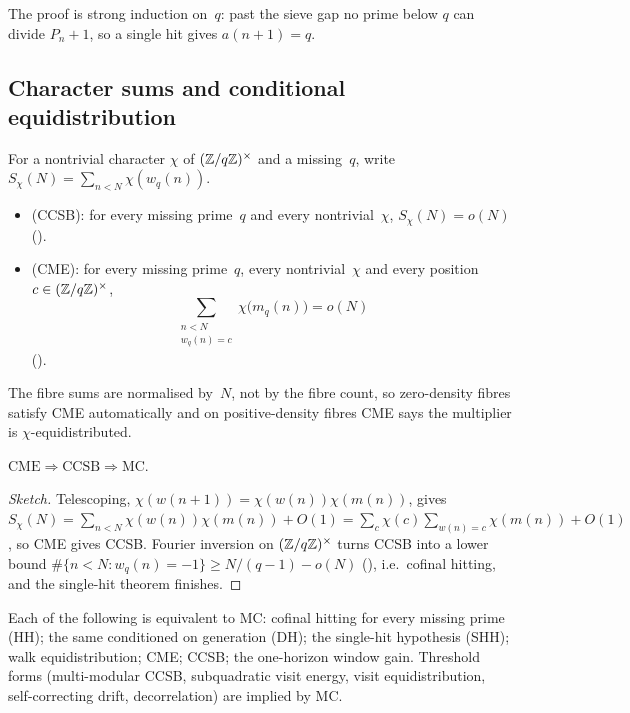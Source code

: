 \documentclass[10pt,a4paper]{article}
\providecommand{\CME}{\mathrm{CME}}
\providecommand{\CCSB}{\mathrm{CCSB}}
\begin{document}
The proof is strong induction on~$q$: past the sieve gap no prime below
$q$ can divide $P_n+1$, so a single hit gives $a(n{+}1)=q$.

\subsection{Character sums and conditional equidistribution}

For a nontrivial character $\chi$ of $(\mathbb{Z}/q\mathbb{Z})^\times$ and a missing~$q$,
write $S_\chi(N)=\sum_{n<N}\chi(w_q(n))$.

\begin{definition}
\begin{itemize}[nosep]
\item {} (CCSB): for every missing prime~$q$ and
every nontrivial~$\chi$, $S_\chi(N)=o(N)$
().
\item {} (CME): for every missing
prime~$q$, every nontrivial~$\chi$ and every position $c\in(\mathbb{Z}/q\mathbb{Z})^\times$,
\[
  \sum_{\substack{n<N\\ w_q(n)=c}}\chi\bigl(m_q(n)\bigr)=o(N)
\]
().
\end{itemize}
\end{definition}

The fibre sums are normalised by~$N$, not by the fibre count, so
zero-density fibres satisfy CME automatically and on positive-density
fibres CME says the multiplier is $\chi$-equidistributed.

\begin{theorem}
$\CME\Rightarrow\CCSB\Rightarrow\mathrm{MC}$.
\end{theorem}

\begin{proof}[Sketch]
Telescoping, $\chi(w(n{+}1))=\chi(w(n))\chi(m(n))$, gives
$S_\chi(N)=\sum_{n<N}\chi(w(n))\chi(m(n))+O(1)=\sum_c\chi(c)\sum_{w(n)=c}\chi(m(n))+O(1)$,
so CME gives CCSB.  Fourier inversion on $(\mathbb{Z}/q\mathbb{Z})^\times$ turns CCSB into
a lower bound $\#\{n<N:w_q(n)=-1\}\ge N/(q-1)-o(N)$
(), i.e.\
cofinal hitting, and the single-hit theorem finishes.
\end{proof}

\begin{theorem}
Each of the following is equivalent to MC: cofinal hitting for every
missing prime (HH); the same conditioned on generation (DH); the
single-hit hypothesis (SHH); walk equidistribution; CME; CCSB; the
one-horizon window gain.  Threshold forms (multi-modular CCSB,
subquadratic visit energy, visit equidistribution, self-correcting drift,
decorrelation) are implied by MC.
\end{theorem}
\end{document}
